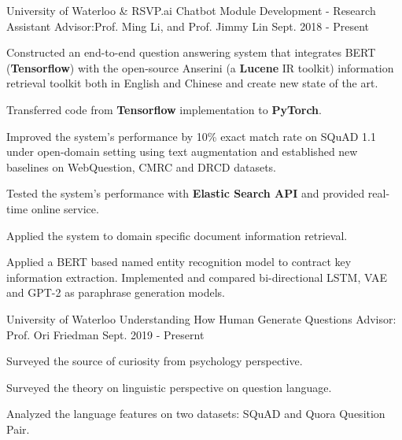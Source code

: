 

\begin{cventries}


 \cventry
    {University of Waterloo \& RSVP.ai}
    {Chatbot Module Development - Research Assistant} %
    {Advisor:Prof. Ming Li, and Prof. Jimmy Lin} %
    {Sept. 2018 - Present} %
    {
      \begin{cvitems} %
        \item {Constructed an end-to-end question answering system that integrates BERT (\textbf{Tensorflow}) with the open-source Anserini (a \textbf{Lucene} IR toolkit) information retrieval toolkit both in English and Chinese and create new state of the art.}
        \item {Transferred code from \textbf{Tensorflow} implementation to \textbf{PyTorch}.}
        \item {Improved the system's performance by 10\% exact match rate on SQuAD 1.1 under open-domain setting using text augmentation and established new baselines on WebQuestion, CMRC and DRCD datasets.}
	\item {Tested the system's performance with \textbf{Elastic Search API} and provided real-time online service.}
        \item {Applied the system to domain specific document information retrieval.}
        \item {Applied a BERT based named entity recognition model to contract key information extraction. Implemented and compared bi-directional LSTM, VAE and GPT-2 as paraphrase generation models.}
      \end{cvitems}
    }
 
   \cventry
    {University of Waterloo}
    {Understanding How Human Generate Questions } %
    {Advisor: Prof. Ori Friedman} %
    {Sept. 2019 - Presernt} %
    {
      \begin{cvitems} %
        \item {Surveyed the source of curiosity from psychology perspective.}
        \item {Surveyed the theory on linguistic perspective on question language.}
        \item {Analyzed the language features on two datasets: SQuAD and Quora Quesition Pair. }
      \end{cvitems}
    }
    

\end{cventries}
